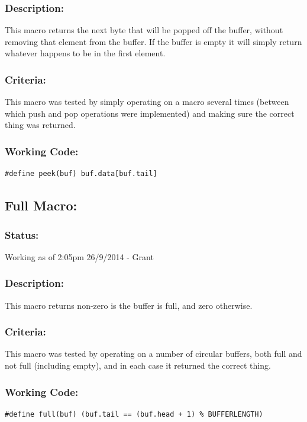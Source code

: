 \documentclass[]{report}
\begin{document}
\subsubsection{Description:}
This macro returns the next byte that will be popped off the buffer, without removing that element from the buffer. If the buffer is empty it will simply return whatever happens to be in the first element.

\subsubsection{Criteria:}
This macro was tested by simply operating on a macro several times (between which push and pop operations were implemented) and making sure the correct thing was returned.

\subsubsection{Working Code:}
\begin{lstlisting}
#define peek(buf) buf.data[buf.tail]
\end{lstlisting}

\subsection{Full Macro:}
\subsubsection{Status:}
Working as of 2:05pm 26/9/2014 - Grant

\subsubsection{Description:}
This macro returns non-zero is the buffer is full, and zero otherwise.

\subsubsection{Criteria:}
This macro was tested by operating on a number of circular buffers, both full and not full (including empty), and in each case it returned the correct thing.

\subsubsection{Working Code:}
\begin{lstlisting}
#define full(buf) (buf.tail == (buf.head + 1) % BUFFERLENGTH)
\end{lstlisting}
\end{document}
